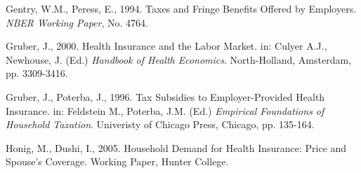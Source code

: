 \documentclass[legno,11pt]{article}
\begin{document}
\begin{thebibliography}{12}


 Gentry, W.M., Peress, E., 1994.
                  Taxes and Fringe Benefits Offered by Employers.
                  \textit{NBER Working Paper}, No. 4764.


%

 Gruber, J., 2000.
                  Health Insurance and the Labor Market.
                 in: Culyer A.J., Newhouse, J. (Ed.) \emph{Handbook of Health Economics}. North-Holland, Amsterdam, pp. 3309-3416.

 Gruber, J., Poterba, J., 1996.
               Tax Subsidies to Employer-Provided Health Insurance.
               in: Feldstein M., Poterba, J.M. (Ed.) \emph{Empirical Foundations of Household Taxation}.
               Univeristy of Chicago Press, Chicago, pp. 135-164.

%

 Honig, M., Dushi, I., 2005.
                 Household Demand for Health Insurance: Price and Spouse's Coverage.
                 Working Paper, Hunter College.


\end{thebibliography}
\end{document}
